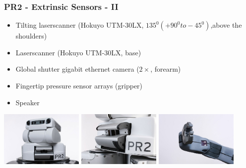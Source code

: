 \begin{frame}
  \frametitle{PR2 - Extrinsic Sensors - II}
\begin{itemize}
    \item Tilting laserscanner (Hokuyo UTM-30LX, $135^0 (+90^0 to -45^0)$,above the shoulders)
    \item Laserscanner (Hokuyo UTM-30LX, base)
    \item Global shutter gigabit ethernet camera ($2\times$, forearm)
    \item Fingertip pressure sensor arrays (gripper)
    \item Speaker
\end{itemize}
\hspace{-4ex}
\includegraphics[width=4cm]{img/head_tiltLRF.jpg} 
\includegraphics[width=4cm]{img/tilted_lrf.jpg}
\includegraphics[width=4cm]{img/pr2_hand_camera.jpg}  
\end{frame}
